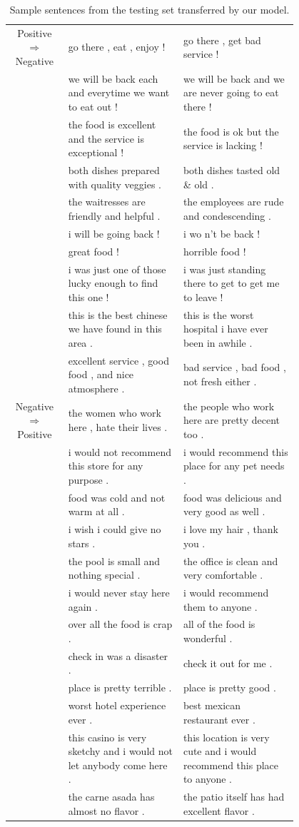 \documentclass{article}
\begin{document}
\begin{table} \label{table:samples}
	\centering
	\begin{tabular}{c|p{0.4\linewidth}|p{0.4\linewidth}}
		\toprule
		Positive $\Rightarrow$ Negative & go there , eat , enjoy ! & go there , get bad service ! \\
		& we will be back each and everytime we want to eat out ! & 					we will be back and we are never going to eat there ! \\
		& the food is excellent and the service is exceptional ! & the food is ok but the service is lacking ! \\
		& both dishes prepared with quality veggies . & both dishes tasted old \& old . \\ 
		& the waitresses are friendly and helpful .	& the employees are rude and condescending . \\
		& i will be going back ! &	i wo n't be back ! \\
		& great food !	&	horrible food ! \\
		& i was just one of those lucky enough to find this one !	&	i was just standing there to get to get me to leave ! \\
		& this is the best chinese we have found in this area .	&	this is the worst hospital i have ever been in awhile . \\
		& excellent service , good food , and nice atmosphere .	&	bad service , bad food , not fresh either . \\
		\midrule
		Negative $\Rightarrow$ Positive & the women who work here , hate their lives . &	the people who work here are pretty decent too . \\
		& i would not recommend this store for any purpose . &	i would recommend this place for any pet needs . \\
		& food was cold and not warm at all . &	food was delicious and very good as well . \\
		& i wish i could give no stars .	&	i love my hair , thank you . \\
		& the pool is small and nothing special .	& the office is clean and very comfortable . \\
		& i would never stay here again .	& i would recommend them to anyone . \\
		& over all the food is crap .	& all of the food is wonderful . \\
		& check in was a disaster .	& check it out for me . \\
		& place is pretty terrible .	& place is pretty good . \\
		& worst hotel experience ever .	& best mexican restaurant ever . \\
		& this casino is very sketchy and i would not let anybody come here .	& this location is very cute and i would recommend this place to anyone . \\
		& the carne asada has almost no flavor .&	the patio itself has had excellent flavor .\\
		\bottomrule
	\end{tabular}
	\caption{Sample sentences from the testing set transferred by our model.}
\end{table}
\end{document}
